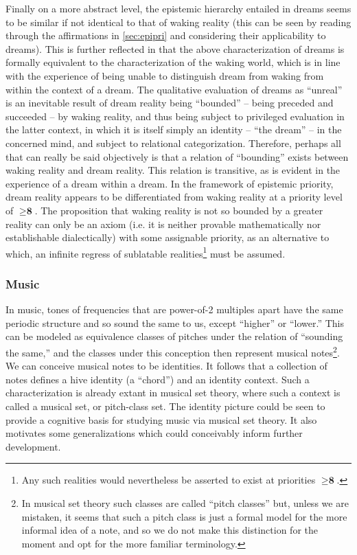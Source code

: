 \documentclass[pra,twocolumn,groupedaddress,10pt]{revtex4}
\theoremstyle{definition}
\begin{document}
Finally on a more abstract level, the epistemic hierarchy entailed in dreams seems to be similar if not identical to that of waking reality (this can be seen by reading through the affirmations in \autoref{sec:epipri} and considering their applicability to dreams). This is further reflected in that the above characterization of dreams is formally equivalent to the characterization of the waking world, which is in line with the experience of being unable to distinguish dream from waking from within the context of a dream. The qualitative evaluation of dreams as ``unreal'' is an inevitable result of dream reality being ``bounded'' -- being preceded and succeeded -- by waking reality, and thus being subject to privileged evaluation in the latter context, in which it is itself simply an identity -- ``the dream'' -- in the concerned mind, and subject to relational categorization. Therefore, perhaps all that can really be said objectively is that a relation of ``bounding'' exists between waking reality and dream reality. This relation is transitive, as is evident in the experience of a dream within a dream. In the framework of epistemic priority, dream reality appears to be differentiated from waking reality at a priority level of $\ge \textbf{8}$. The proposition that waking reality is not so bounded by a greater reality can only be an axiom (i.e. it is neither provable mathematically nor establishable dialectically) with some assignable priority, as an alternative to which, an infinite regress of sublatable realities\footnote{Any such realities would nevertheless be asserted to exist at priorities $\ge \textbf{8}$.} must be assumed.

\subsubsection{Music} \label{sec:music}

In music, tones of frequencies that are power-of-2 multiples apart have the same periodic structure and so sound the same to us, except ``higher'' or ``lower.'' This can be modeled as equivalence classes of pitches under the relation of ``sounding the same,'' and the classes under this conception then represent musical notes\footnote{In musical set theory such classes are called ``pitch classes'' but, unless we are mistaken, it seems that such a pitch class is just a formal model for the more informal idea of a note, and so we do not make this distinction for the moment and opt for the more familiar terminology.}. We can conceive musical notes to be identities. It follows that a collection of notes defines a hive identity (a ``chord'') and an identity context. Such a characterization is already extant in musical set theory\cite{musicalsettheory}, where such a context is called a musical set, or pitch-class set. The identity picture could be seen to provide a cognitive basis for studying music via musical set theory. It also motivates some generalizations which could conceivably inform further development.
\end{document}
